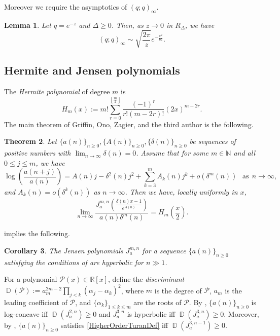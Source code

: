\documentclass[11pt,reqno,a4paper]{amsart}
\renewcommand{\a}{\alpha}
\renewcommand{\d}{{\delta}}
\renewcommand{\(}{\left\(}
\renewcommand{\)}{\right\)}
\numberwithin{equation}{section}
\theoremstyle{plain}
\newtheorem{theorem}{Theorem}[section]
\newtheorem{lemma}[theorem]{Lemma}
\newtheorem{corollary}[theorem]{Corollary}
\theoremstyle{definition} %
\numberwithin{equation}{section}
\begin{document}
Moreover we require the asymptotics of $(q;q)_{\infty}$. 
\begin{lemma}\label{sec0lem1}%
	Let $q=e^{-z}$ and $\Delta\ge 0$. Then, as $z\to 0$ in $R_{\Delta}$, we have
	\[
	(q;q)_{\infty}\sim \sqrt{\frac{2\pi}{z}}e^{-\frac{\pi^2}{6z}}.
	\]
\end{lemma}



\subsection{Hermite and Jensen polynomials} The {\it Hermite polynomial} of degree $m$ is %
\begin{equation}\label{Hermitedef}
H_m(x):=m!\sum_{r=0}^{\left\lfloor\frac m2\right\rfloor}\frac{(-1)^r}{r!\left(m-2r\right)!}(2x)^{m-2r}.
\end{equation}
The main theorem of Griffin, Ono, Zagier, and the third author is the following. 
\begin{theorem}\cite[Theorem 3]{GORZ}\label{GORZThm1}
	Let $\{a(n)\}_{n\ge 0}, \{A(n)\}_{n\ge 0}, \{\d(n)\}_{n\ge 0}$ be sequences of positive numbers with $\lim_{n\to \infty}\d(n)=0$. Assume that for some $m\in \mathbb{N}$ and all $0\le j\le m$, we have
	\begin{equation*}%
	\log\left(\frac{a(n+j)}{a(n)}\right)=A(n)j-\d^2(n)j^2+\sum_{k=3}^{m}A_k(n)j^k+o\left(\d^{m}(n)\right)\ \ \text{ as}\ \ n\to \infty,
	\end{equation*}
 and $A_k(n)=o(\d^k(n))$ as $n\to \infty$. Then we have, locally uniformly in $x$,
	\[
	\lim_{n\to \infty}\frac{J^{m,n}_{a}\left(\frac{\d(n)x-1}{e^{A(n)}}\right)}{a(n)\d^{m}(n)}=H_m\left(\frac x2\right).
	\]
\end{theorem}
 implies the following.
\begin{corollary}\cite[Corollary 4]{GORZ}\label{GORZcor1}
	The Jensen polynomials $J^{m,n}_{a}$ for a sequence $\{a(n)\}_{n\ge 0}$ satisfying the conditions of  are hyperbolic for $n\!\gg\!1$.
\end{corollary}

 For a polynomial $\mathcal{P}(x)\in \mathbb{R}[x]$, define the {\it discriminant} $\operatorname{\mathbb{D}}(\mathcal{P})\!\!:=\!a^{2m-2}_m\prod_{j< k}(\a_j-\a_k)^2$, where $m$ is the degree of $\mathcal{P}$, $a_m$ is the leading coefficient of $\mathcal{P}$, and $\{\a_k\}_{1\le k\le m}$ are the roots of $\mathcal{P}$. By \cite[Section 6]{Chen1}, $\{a(n)\}_{n\ge 0}$ is log-concave iff $\operatorname{\mathbb{D}}(J^{2,n}_a)\ge 0$ and $J^{3,n}_a$ is hyperbolic iff $\operatorname{\mathbb{D}}(J^{3,n}_a)\ge 0$. Moreover, by \cite[equation (1.2)]{Chen2},  $\{a(n)\}_{n\ge 0}$ satisfies \eqref{HigherOrderTuranDef} iff $\operatorname{\mathbb{D}}(J^{3,{n-1}}_a)\ge 0$.  
\end{document}

